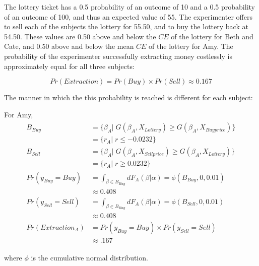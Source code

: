 \documentclass[11pt,a4paper]{article}
\newcommand\CE{\ensuremath{\mathit{CE}}}  %
\newcommand\Prob{\ensuremath{\mathit{Pr}}}  %
\begin{document}
The lottery ticket has a 0.5 probability of an outcome of 10 and a 0.5 probability of an outcome of 100, and thus an expected value of 55.
The experimenter offers to sell each of the subjects the lottery for 55.50, and to buy the lottery back at 54.50.
These values are 0.50 above and below the {\CE} of the lottery for Beth and Cate, and  0.50 above and below the mean {\CE} of the lottery for Amy.
The probability of the experimenter successfully extracting money costlessly is approximately equal for all three subjects:

\begin{equation}
	\label{eq:pr.extraction}
	{\Prob}(\mathit{Extraction}) = {\Prob}(\mathit{Buy}) \times {\Prob}(\mathit{Sell}) \approx 0.167
\end{equation}

\noindent The manner in which the this probability is reached is different for each subject:

\noindent For Amy,
\begin{align}
	\label{eq:Amy}
	\begin{split}
		B_{\mathit{Buy}} &= \{ \beta_A |\; G(\beta_A,X_{\mathit{Lottery}}) \geq G(\beta_A,X_{\mathit{Buy price}})\}\\
		&= \{ r_A \big|\; r \leq -0.0232 \} \\
		B_{\mathit{Sell}} &= \{ \beta_A |\; G(\beta_A,X_{\mathit{Sell price}}) \geq G(\beta_A,X_{\mathit{Lottery}})\}\\
		&= \{ r_A \big|\; r \geq 0.0232 \} \\[0.5ex]
		{\Prob}(y_{\mathit{Buy}}=\mathit{Buy}) &= \int_{\beta \in B_{\mathit{Buy}}} dF_A(\beta|\alpha) = \phi(B_{\mathit{Buy}},0,0.01)\\[0.5ex]
		&\approx 0.408 \\
		{\Prob}(y_{\mathit{Sell}}=\mathit{Sell}) &= \int_{\beta \in B_{\mathit{Buy}}} dF_A(\beta|\alpha) = \phi(B_{\mathit{Sell}},0,0.01)\\[0.5ex]
		&\approx 0.408 \\
		{\Prob}(\mathit{Extraction}_A) &= {\Prob}(y_{\mathit{Buy}} = \mathit{Buy}) \times {\Prob}(y_{\mathit{Sell}} = \mathit{Sell})\\
		&\approx .167
	\end{split}
\end{align}

\noindent where $\phi$ is the cumulative normal distribution.
\end{document}
